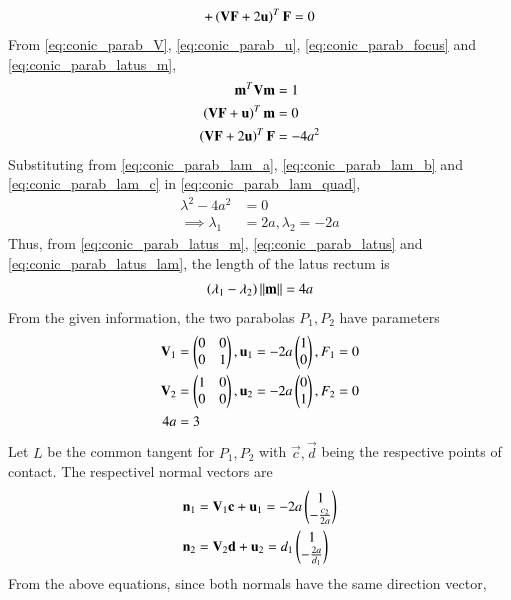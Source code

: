 \documentclass[journal,12pt,twocolumn]{IEEEtran}
\begin{document}
\begin{enumerate}[label=\arabic*]
\begin{multline}
\\
+\left(\mathbf{V}\mathbf{F}+2\mathbf{u}\right)^T\mathbf{F} = 0
\end{multline}
From \eqref{eq:conic_parab_V}, \eqref{eq:conic_parab_u}, \eqref{eq:conic_parab_focus} and \eqref{eq:conic_parab_latus_m}, 
\begin{align}
\label{eq:conic_parab_lam_a}
\mathbf{m}^T\mathbf{V}\mathbf{m} &= 1
\\
\label{eq:conic_parab_lam_b}
\left(\mathbf{V}\mathbf{F}+\mathbf{u}\right)^T\mathbf{m} &= 0
\\
\left(\mathbf{V}\mathbf{F}+2\mathbf{u}\right)^T\mathbf{F} &= -4a^2
\label{eq:conic_parab_lam_c}
\end{align}
Substituting from \eqref{eq:conic_parab_lam_a}, \eqref{eq:conic_parab_lam_b}  and \eqref{eq:conic_parab_lam_c} in \eqref{eq:conic_parab_lam_quad}, 
\begin{align}
\lambda^2  - 4a^2 &=0
\\
\implies \lambda_1 &=2a,\lambda_2 =-2a
\label{eq:conic_parab_latus_lam}
\end{align}
%
Thus, from \eqref{eq:conic_parab_latus_m}, \eqref{eq:conic_parab_latus}
 and \eqref{eq:conic_parab_latus_lam}, the length of the latus rectum is
\begin{align}
\left(\lambda_1-\lambda_2\right) \left\Vert\mathbf{m}\right\Vert = 4a
\end{align}
%
From the given information, the two parabolas $P_1, P_2$ have parameters
\begin{align}
\label{eq:conic_parab_param1}
\mathbf{V}_1&=\begin{pmatrix}0 & 0 \\ 0& 1\end{pmatrix},\mathbf{u}_1=-2a\begin{pmatrix}1 \\ 0\end{pmatrix},F_1=0
\\
\label{eq:conic_parab_param2}
\mathbf{V}_2&=\begin{pmatrix}1 & 0 \\ 0& 0\end{pmatrix},
\mathbf{u}_2=-2a\begin{pmatrix}0 \\ 1\end{pmatrix},
F_2=0
\\
4a&=3
\label{eq:conic_parab_a}
\end{align}
Let $L$ be the common tangent for $P_1,P_2$ with  $\vec{c},\vec{d}$ being the respective points of contact. The respectivel normal vectors are
\begin{align}
\mathbf{n}_1 &= \mathbf{V}_1\mathbf{c}+\mathbf{u}_1 = -2a\begin{pmatrix}1\\-\frac{c_2}{2a}\end{pmatrix}
\\
\mathbf{n}_2 &= \mathbf{V}_2\mathbf{d}+\mathbf{u}_2  = d_1\begin{pmatrix}1\\-\frac{2a}{d_1}\end{pmatrix}
\end{align}
%
From the above equations, since both normals have the same direction vector, 

\end{enumerate}
\end{document}
